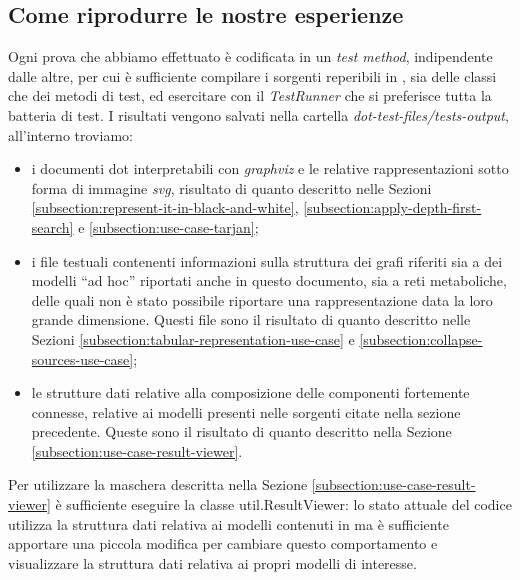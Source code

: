 \subsection{Come riprodurre le nostre esperienze}
Ogni prova che abbiamo effettuato \`e codificata in un \emph{test
  method}, indipendente dalle altre, per cui \`e sufficiente compilare
i sorgenti reperibili in \cite{MyJavaImpl}, sia delle classi che dei
metodi di test, ed esercitare con il \emph{TestRunner} che si
preferisce tutta la batteria di test. I risultati vengono salvati
nella cartella \emph{dot-test-files/tests-output}, all'interno
troviamo:
\begin{itemize}
\item i documenti dot interpretabili con \emph{graphviz} e le relative
  rappresentazioni sotto forma di immagine \emph{svg}, risultato di
  quanto descritto nelle Sezioni
  \ref{subsection:represent-it-in-black-and-white},
  \ref{subsection:apply-depth-first-search} e
  \ref{subsection:use-case-tarjan};
\item i file testuali contenenti informazioni sulla struttura dei
  grafi riferiti sia a dei modelli ``ad hoc'' riportati anche in
  questo documento, sia a reti metaboliche, delle quali non \`e stato
  possibile riportare una rappresentazione data la loro grande
  dimensione. Questi file sono il risultato di quanto descritto nelle
  Sezioni \ref{subsection:tabular-representation-use-case} e
  \ref{subsection:collapse-sources-use-case};
\item le strutture dati relative alla composizione delle componenti
  fortemente connesse, relative ai modelli presenti nelle sorgenti
  citate nella sezione precedente. Queste sono il risultato di quanto
  descritto nella Sezione \ref{subsection:use-case-result-viewer}.
\end{itemize}
Per utilizzare la maschera descritta nella Sezione
\ref{subsection:use-case-result-viewer} \`e sufficiente eseguire la
classe util.ResultViewer: lo stato attuale del codice utilizza la
struttura dati relativa ai modelli contenuti in \cite{MetExplore} ma
\`e sufficiente apportare una piccola modifica per cambiare questo
comportamento e visualizzare la struttura dati relativa ai propri
modelli di interesse.

